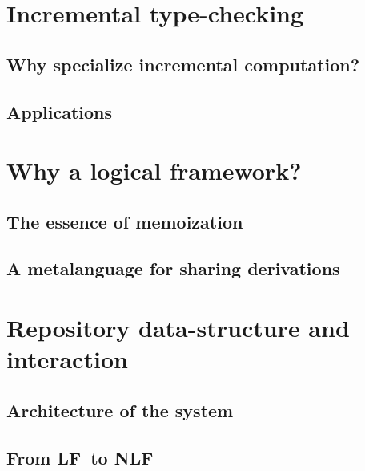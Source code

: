 \documentclass[preprint]{sigplanconf}
\newcommand\lang[1]{\textsf{#1}}
\newcommand\LF{\lang{LF}}
\newcommand\NLF{\lang{NLF}}
\begin{document}

\section{Incremental type-checking} %


\subsection{Why specialize incremental computation?}

\subsection{Applications}

\section{Why a logical framework?} %

\subsection{The essence of memoization}

\subsection{A metalanguage for sharing derivations}



\section{Repository data-structure and interaction}


\subsection{Architecture of the system}

\subsection{From \LF\ to \NLF}
\end{document}
